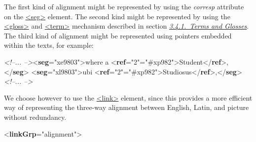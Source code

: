 The first kind of alignment might be represented by using the {\itshape corresp} attribute on the \hyperref[TEI.seg]{<seg>} element. The second kind might be represented by using the \hyperref[TEI.gloss]{<gloss>} and \hyperref[TEI.term]{<term>} mechanism described in section \textit{\hyperref[COHTG]{3.4.1.\ Terms and Glosses}}. The third kind of alignment might be represented using pointers embedded within the texts, for example: \par\bgroup{}\exampleFont \begin{shaded}\noindent\mbox{}\mbox{}\newline 
\textit{<!--... -->}{<\textbf{seg}\hspace*{1em}{xml:id}="{xe9803}">}where a {<\textbf{ref}\hspace*{1em}{n}="{2}"\hspace*{1em}{target}="{\#xp982}">}Student{</\textbf{ref}>},{</\textbf{seg}>}\mbox{}\newline 
{<\textbf{seg}\hspace*{1em}{xml:id}="{xl9803}">}ubi {<\textbf{ref}\hspace*{1em}{n}="{2}"\hspace*{1em}{target}="{\#xp982}">}Studiosus{</\textbf{ref}>},{</\textbf{seg}>}\mbox{}\newline 
\textit{<!--... -->}\end{shaded}\egroup\par \noindent  We choose however to use the \hyperref[TEI.link]{<link>} element, since this provides a more efficient way of representing the three-way alignment between English, Latin, and picture without redundancy. \par\bgroup{}\exampleFont \begin{shaded}\noindent\mbox{}{<\textbf{linkGrp}\hspace*{1em}{type}="{alignment}">}\mbox{}\newline 

\end{shaded}
